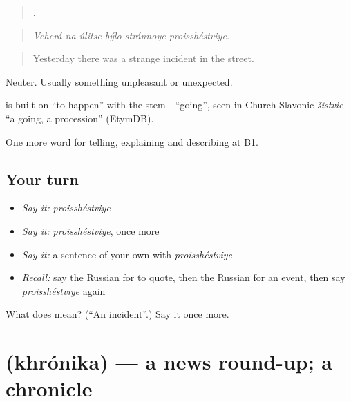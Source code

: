 \begin{quote}
     .
\end{quote}

\begin{quote}
\emph{Vcherá na úlitse býlo stránnoye proisshéstviye.}
\end{quote}

\begin{quote}
Yesterday there was a strange incident in the street.
\end{quote}

Neuter. Usually something unpleasant or unexpected.

\begin{cousinweb}
\emph{} is built on \emph{} \textquotedblleft{}to happen\textquotedblright{} with the stem \emph{-} \textquotedblleft{}going\textquotedblright{}, seen in Church Slavonic \emph{šĭstvie} \textquotedblleft{}a going, a procession\textquotedblright{} (EtymDB).
\end{cousinweb}

\begin{grammarlens}[title={What you've built}]
One more word for telling, explaining and describing at B1.
\end{grammarlens}

\subsection*{Your turn}
\begin{itemize}
\raggedright
  \item \emph{Say it:} \emph{proisshéstviye}
  \item \emph{Say it:} \emph{proisshéstviye}, once more
  \item \emph{Say it:} a sentence of your own with \emph{proisshéstviye}
  \item \emph{Recall:} say the Russian for to quote, then the Russian for an event, then say \emph{proisshéstviye} again
\end{itemize}

\begin{tcolorbox}[breakable,colback=teal!4,colframe=teal!35!black,title={Before you move on}]
What does  mean? (\textquotedblleft{}An incident\textquotedblright{}.) Say it once more.
\end{tcolorbox}
\section[\texorpdfstring{\ru{хроника} (khrónika)}{хроника (khrónika)}]{ (khrónika) — a news round-up; a chronicle}

